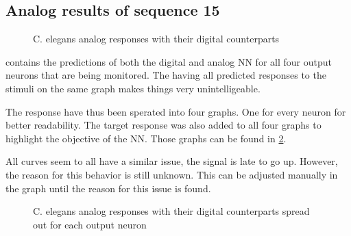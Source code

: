 \subsection{Analog results of sequence 15}
\label{subsec:analog15Celegans}

\begin{figure}[H]
  \centering
  
  \caption{\acs{C. elegans} analog responses with their digital counterparts}
  \label{graph:celegansAnalog0}
\end{figure}

 contains the predictions of both the digital and analog \ac{NN} for all four output neurons that are being monitored. The having all predicted responses to the stimuli on the same graph makes things very unintelligeable.

The response have thus been sperated into four graphs. One for every neuron for better readability. The target response was also added to all four graphs to highlight the objective of the \ac{NN}. Those graphs can be found in \cref{graph:spread15Celegans}.

All curves seem to all have a similar issue, the signal is late to go up. However, the reason for this behavior is still unknown. This can be adjusted manually in the graph until the reason for this issue is found.

\begin{figure}[H]
  \centering
  \begin{minipage}{\columnwidth}
    \hfill
  \end{minipage}
  \begin{minipage}{\columnwidth}
    \hfill
  \end{minipage}
  \caption{\ac{C. elegans} analog responses with their digital counterparts spread out for each output neuron}
  \label{graph:spread15Celegans}
\end{figure}


